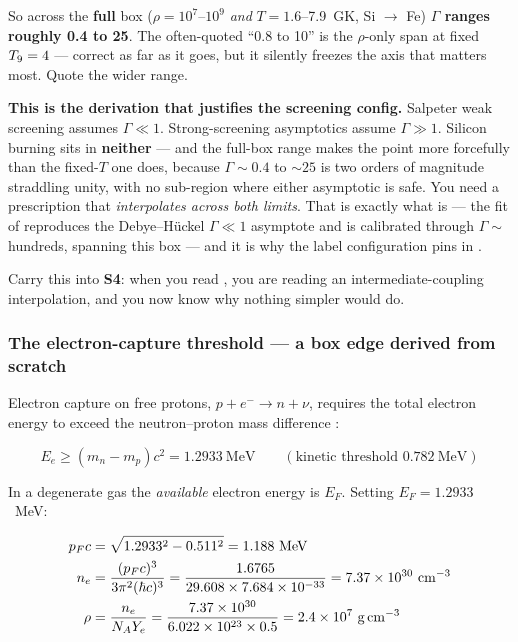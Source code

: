 So across the \textbf{full} box ($\rho = 10^{7}$--$10^{9}$ \emph{and}
$T = 1.6$--7.9~GK, Si $\to$ Fe) \textbf{$\Gamma$ ranges roughly 0.4 to 25}. The
often-quoted ``0.8 to 10'' is the $\rho$-only span at fixed $T_{9} = 4$ ---
correct as far as it goes, but it silently freezes the axis that matters most.
Quote the wider range.

\begin{aside}
\textbf{This is the derivation that justifies the screening config.} Salpeter
weak screening \citep{salpeter1954} assumes $\Gamma \ll 1$. Strong-screening
asymptotics assume $\Gamma \gg 1$. Silicon burning sits in \textbf{neither} ---
and the full-box range makes the point more forcefully than the fixed-$T$ one
does, because $\Gamma \sim 0.4$ to ${\sim}25$ is two orders of magnitude
straddling unity, with no sub-region where either asymptotic is safe. You need
a prescription that \emph{interpolates across both limits}. That is exactly
what  is --- the fit of \citet{chugunov2007} reproduces the
Debye--Hückel $\Gamma \ll 1$ asymptote and is calibrated through
$\Gamma \sim$ hundreds, spanning this box --- and it is why the label
configuration pins  in
.
\end{aside}

Carry this into \textbf{S4}: when you read , you are
reading an intermediate-coupling interpolation, and you now know why nothing
simpler would do.

\subsubsection{The electron-capture threshold --- a box edge derived from scratch}
\label{sec:ecthreshold}

Electron capture on free protons, $p + e^- \to n + \nu$, requires the total
electron energy to exceed the neutron--proton mass difference
\citep{codata2022}:

\begin{equation*}
E_e \geq (m_n-m_p)c^2 = 1.2933\ \mathrm{MeV}
\qquad (\text{kinetic threshold } 0.782\ \mathrm{MeV})
\end{equation*}

In a degenerate gas the \emph{available} electron energy is $E_F$. Setting
$E_F = 1.2933$~MeV:

\begin{align*}
p_F c &= \sqrt{1.2933^2 - 0.511^2} = 1.188\ \mathrm{MeV}\\
n_e &= \frac{(p_F c)^3}{3\pi^2(\hbar c)^3}
     = \frac{1.6765}{29.608\times 7.684\times10^{-33}}
     = 7.37\times10^{30}\ \mathrm{cm^{-3}}\\
\rho &= \frac{n_e}{N_A Y_e}
      = \frac{7.37\times10^{30}}{6.022\times10^{23}\times 0.5}
      = 2.4\times10^{7}\ \mathrm{g\,cm^{-3}}
\end{align*}

